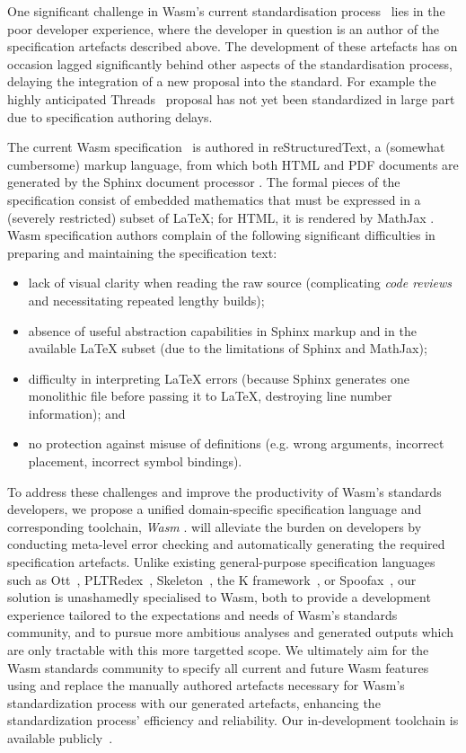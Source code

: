 One significant challenge in Wasm's current standardisation
process~\cite{wasm-process} lies in the poor developer experience,
where the developer in question is an author of the specification artefacts described above.
The development of these
artefacts has on occasion lagged significantly behind other aspects of the standardisation process,
delaying the integration of a new proposal into the standard.
For example the highly anticipated Threads~\cite{wasm-threads} proposal has not yet been standardized in large part due to specification authoring delays.

The current Wasm specification~\cite{wasm-spec} is authored in reStructuredText,
a (somewhat cumbersome) markup language, from which both HTML and PDF documents
are generated by the Sphinx document processor \cite{sphinx}.
The formal pieces of the specification consist of embedded mathematics that must be
expressed in a (severely restricted) subset of LaTeX;
for HTML, it is rendered by MathJax \cite{mathjax}.
%
Wasm specification authors complain of the following significant difficulties in preparing and maintaining the specification text:\vspace{-0\baselineskip}
\begin{itemize}
\item lack of visual clarity when reading the raw source (complicating \emph{code reviews} and necessitating repeated lengthy builds);
\item absence of useful abstraction capabilities in Sphinx markup and in the available LaTeX subset
(due to the limitations of Sphinx and MathJax);
\item difficulty in interpreting LaTeX errors (because Sphinx generates one monolithic file before passing it to LaTeX, destroying line number information); and
\item no protection against misuse of definitions (e.g. wrong arguments, incorrect placement, incorrect symbol bindings).
\end{itemize}
\vspace{-0\baselineskip}

To address these challenges and improve the productivity of Wasm's standards
developers, we propose a unified domain-specific specification language and
corresponding toolchain, \emph{Wasm \dslname}.  \dslname will alleviate the
burden on developers by conducting meta-level error checking and automatically
generating the required specification artefacts.  Unlike existing
general-purpose specification languages such as Ott~\cite{ott},
PLTRedex~\cite{pltredex}, Skeleton~\cite{skeleton}, the K framework~\cite{k},
or Spoofax~\cite{spoofax}, our solution is unashamedly specialised to Wasm,  both to provide a development experience tailored to the expectations and needs of Wasm's standards
community, and to pursue more ambitious analyses and generated outputs which are only tractable with this more targetted scope. 
%
We ultimately aim for the Wasm standards community to specify all current and future Wasm features using \dslname and replace the manually authored
artefacts necessary for Wasm's standardization process with our generated artefacts, enhancing the  standardization process' efficiency and reliability.
%
Our in-development \dslname toolchain is available publicly~\cite{spectec}.
